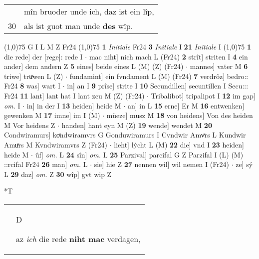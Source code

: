 \documentclass[8pt,a4paper,notitlepage]{article}
\begin{document}
\begin{table}[ht]
\begin{minipage}[t]{0.5\linewidth}
\begin{tabular}{rl}
 & mîn bruoder unde ich, daz ist ein lîp,\\ 
30 & als ist guot man unde \textbf{des} wîp.\\ 
\end{tabular}
\scriptsize
\line(1,0){75} \newline
G I L M Z Fr24 \newline
\line(1,0){75} \newline
\textbf{1} \textit{Initiale} Fr24  \textbf{3} \textit{Initiale} I  \textbf{21} \textit{Initiale} I  \newline
\line(1,0){75} \newline
\textbf{1} die rede] der [rege]: rede I  $\cdot$ mac niht] nich mach L (Fr24) \textbf{2} strît] striten I \textbf{4} ein ander] dem andern Z \textbf{5} eines] beide eines L (M) (Z) (Fr24)  $\cdot$ mannes] vater M \textbf{6} triwe] truͯwen L (Z)  $\cdot$ fundamint] ein fvndament L (M) (Fr24) \textbf{7} verdrôz] bedro:: Fr24 \textbf{8} was] wart I  $\cdot$ in] an I \textbf{9} prîse] strite I \textbf{10} Secundillen] secuntillen I Secu::: Fr24 \textbf{11} lant] lant hat I lant zcu M (Z) (Fr24)  $\cdot$ Tribalibot] tripalipot I \textbf{12} im gap] \textit{om.} I  $\cdot$ in] in der I \textbf{13} heiden] heide M  $\cdot$ an] in L \textbf{15} erne] Er M \textbf{16} entwenken] gewenken M \textbf{17} imne] im I (M)  $\cdot$ müeze] musz M \textbf{18} von heidens] Von des heiden M Vor heidens Z  $\cdot$ handen] hant eyn M (Z) \textbf{19} wende] wendet M \textbf{20} Condwiramurs] koͮndwiramvrs G Gonduwiramurs I Cvndwir Amvͯrs L Kundwir Amuͯrs M Kvndwiramvrs Z (Fr24)  $\cdot$ lieht] lýcht L (M) \textbf{22} die] vnd I \textbf{23} heiden] heide M  $\cdot$ ûf] \textit{om.} L \textbf{24} sîn] \textit{om.} L \textbf{25} Parzival] parcifal G Z Parzifal I (L) (M) ::rcifal Fr24 \textbf{26} man] \textit{om.} L  $\cdot$ sie] hie Z \textbf{27} nennen wil] wil nemen I (Fr24)  $\cdot$ ze] sý L \textbf{29} daz] \textit{om.} Z \textbf{30} wîp] gvt wip Z \newline
\end{minipage}
\hspace{0.5cm}
\begin{minipage}[t]{0.5\linewidth}
\small
\begin{center}*T
\end{center}
\begin{tabular}{rl}
 & \begin{large}D\end{large}az \textit{ich} die rede \textbf{niht mac} verdagen,\\ 

\end{tabular}
\end{minipage}
\end{table}
\end{document}
